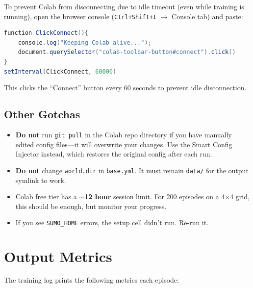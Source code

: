 \documentclass[11pt,a4paper]{article}
\begin{document}
To prevent Colab from disconnecting due to idle timeout (even while training is running), open the browser console (\texttt{Ctrl+Shift+I} $\to$ Console tab) and paste:

\begin{lstlisting}[language=Java]
function ClickConnect(){
    console.log("Keeping Colab alive...");
    document.querySelector("colab-toolbar-button#connect").click()
}
setInterval(ClickConnect, 60000)
\end{lstlisting}

This clicks the ``Connect'' button every 60 seconds to prevent idle disconnection.

\subsection{Other Gotchas}

\begin{itemize}
    \item \textbf{Do not} run \texttt{git pull} in the Colab repo directory if you have manually edited config files---it will overwrite your changes. Use the Smart Config Injector instead, which restores the original config after each run.
    \item \textbf{Do not} change \texttt{world.dir} in \texttt{base.yml}. It must remain \texttt{data/} for the output symlink to work.
    \item Colab free tier has a \textbf{$\sim$12 hour} session limit. For 200 episodes on a 4$\times$4 grid, this should be enough, but monitor your progress.
    \item If you see \texttt{SUMO\_HOME} errors, the setup cell didn't run. Re-run it.
\end{itemize}

\section{Output Metrics}

The training log prints the following metrics each episode:
\end{document}
